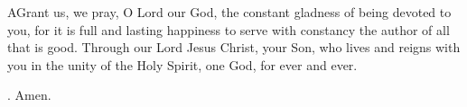 \lettrine[lines=3]{A}{}Grant us, we pray, O Lord our God, the constant gladness of being devoted to you, for it is full and lasting happiness to serve with constancy the author of all that is good. Through our Lord Jesus Christ, your Son, who lives and reigns with you in the unity of the Holy Spirit, one God, for ever and ever. \par \Rbar. Amen.
